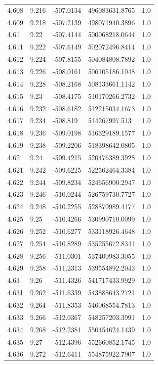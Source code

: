 \begin{tabular}{lllll}
4.608 & 9.216 & -507.0134 & 496083631.8765 & 1.0 \\
4.609 & 9.218 & -507.2139 & 498071940.3896 & 1.0 \\
4.61 & 9.22 & -507.4144 & 500068218.0644 & 1.0 \\
4.611 & 9.222 & -507.6149 & 502072496.8414 & 1.0 \\
4.612 & 9.224 & -507.8155 & 504084808.7892 & 1.0 \\
4.613 & 9.226 & -508.0161 & 506105186.1048 & 1.0 \\
4.614 & 9.228 & -508.2168 & 508133661.1142 & 1.0 \\
4.615 & 9.23 & -508.4175 & 510170266.2732 & 1.0 \\
4.616 & 9.232 & -508.6182 & 512215034.1673 & 1.0 \\
4.617 & 9.234 & -508.819 & 514267997.513 & 1.0 \\
4.618 & 9.236 & -509.0198 & 516329189.1577 & 1.0 \\
4.619 & 9.238 & -509.2206 & 518398642.0805 & 1.0 \\
4.62 & 9.24 & -509.4215 & 520476389.3928 & 1.0 \\
4.621 & 9.242 & -509.6225 & 522562464.3384 & 1.0 \\
4.622 & 9.244 & -509.8234 & 524656900.2947 & 1.0 \\
4.623 & 9.246 & -510.0244 & 526759730.7727 & 1.0 \\
4.624 & 9.248 & -510.2255 & 528870989.4177 & 1.0 \\
4.625 & 9.25 & -510.4266 & 530990710.0099 & 1.0 \\
4.626 & 9.252 & -510.6277 & 533118926.4648 & 1.0 \\
4.627 & 9.254 & -510.8289 & 535255672.8341 & 1.0 \\
4.628 & 9.256 & -511.0301 & 537400983.3055 & 1.0 \\
4.629 & 9.258 & -511.2313 & 539554892.2043 & 1.0 \\
4.63 & 9.26 & -511.4326 & 541717433.9929 & 1.0 \\
4.631 & 9.262 & -511.6339 & 543888643.2721 & 1.0 \\
4.632 & 9.264 & -511.8353 & 546068554.7813 & 1.0 \\
4.633 & 9.266 & -512.0367 & 548257203.3991 & 1.0 \\
4.634 & 9.268 & -512.2381 & 550454624.1439 & 1.0 \\
4.635 & 9.27 & -512.4396 & 552660852.1745 & 1.0 \\
4.636 & 9.272 & -512.6411 & 554875922.7907 & 1.0 \\

\end{tabular}
